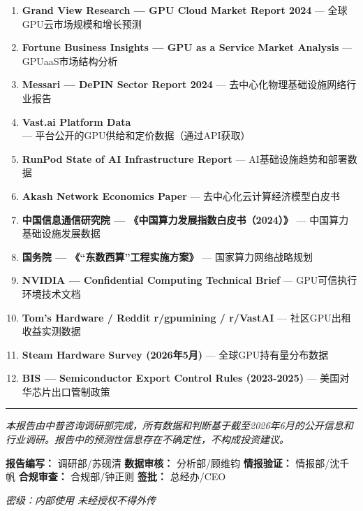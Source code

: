 \documentclass[UTF8,a4paper,12pt]{ctexart}
\begin{document}
\begin{enumerate}
\def\labelenumi{\arabic{enumi}.}
\tightlist
\item
  \textbf{Grand View Research --- GPU Cloud Market Report 2024} ---
  全球GPU云市场规模和增长预测
\item
  \textbf{Fortune Business Insights --- GPU as a Service Market
  Analysis} --- GPUaaS市场结构分析
\item
  \textbf{Messari --- DePIN Sector Report 2024} ---
  去中心化物理基础设施网络行业报告
\item
  \textbf{Vast.ai Platform Data} ---
  平台公开的GPU供给和定价数据（通过API获取）
\item
  \textbf{RunPod State of AI Infrastructure Report} ---
  AI基础设施趋势和部署数据
\item
  \textbf{Akash Network Economics Paper} ---
  去中心化云计算经济模型白皮书
\item
  \textbf{中国信息通信研究院 --- 《中国算力发展指数白皮书（2024）》} ---
  中国算力基础设施发展数据
\item
  \textbf{国务院 --- 《``东数西算''工程实施方案》} ---
  国家算力网络战略规划
\item
  \textbf{NVIDIA --- Confidential Computing Technical Brief} ---
  GPU可信执行环境技术文档
\item
  \textbf{Tom's Hardware / Reddit r/gpumining / r/VastAI} ---
  社区GPU出租收益实测数据
\item
  \textbf{Steam Hardware Survey (2026年5月)} --- 全球GPU持有量分布数据
\item
  \textbf{BIS --- Semiconductor Export Control Rules (2023-2025)} ---
  美国对华芯片出口管制政策
\end{enumerate}

\begin{center}\rule{0.5\linewidth}{0.5pt}\end{center}

\emph{本报告由中普咨询调研部完成，所有数据和判断基于截至2026年6月的公开信息和行业调研。报告中的预测性信息存在不确定性，不构成投资建议。}

\textbf{报告编写：} 调研部/苏砚清 \textbf{数据审核：} 分析部/顾维钧
\textbf{情报验证：} 情报部/沈千帆 \textbf{合规审查：} 合规部/钟正则
\textbf{签批：} 总经办/CEO

\emph{密级：内部使用 \textbar{} 未经授权不得外传}
\end{document}
